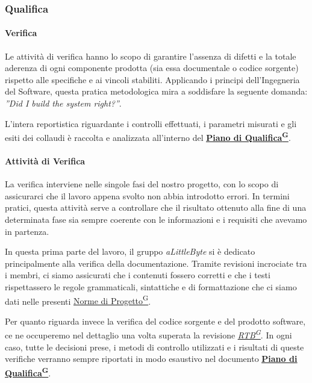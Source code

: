 \documentclass[a4paper,12pt]{article}
\providecommand{\glslink}[2]{\href{https://alittlebyte-19.github.io/Documentazione/glossario.html\#gls-#1}{\underline{#2}\textsuperscript{\scriptsize G}}}
\begin{document}
\subsubsection{Qualifica}

\paragraph{Verifica}

Le attività di verifica hanno lo scopo di garantire l'assenza di difetti e la totale aderenza di ogni componente prodotta (sia essa documentale o codice sorgente) rispetto alle specifiche e ai vincoli stabiliti. Applicando i principi dell'Ingegneria del Software, questa pratica metodologica mira a soddisfare la seguente domanda: \textit{''Did I build the system right?''}.

L'intera reportistica riguardante i controlli effettuati, i parametri misurati e gli esiti dei collaudi è raccolta e analizzata all'interno del \textbf{\glslink{piano-di-qualifica}{Piano di Qualifica}}. 

\paragraph{Attività di Verifica}

La verifica interviene nelle singole fasi del nostro progetto, con lo scopo di assicurarci che il lavoro appena svolto non abbia introdotto errori. In termini pratici, questa attività serve a controllare che il risultato ottenuto alla fine di una determinata fase sia sempre coerente con le informazioni e i requisiti che avevamo in partenza.

In questa prima parte del lavoro, il gruppo \textit{aLittleByte} si è dedicato principalmente alla verifica della documentazione. Tramite revisioni incrociate tra i membri, ci siamo assicurati che i contenuti fossero corretti e che i testi rispettassero le regole grammaticali, sintattiche e di formattazione che ci siamo dati nelle presenti \glslink{norme-di-progetto}{Norme di Progetto}.

Per quanto riguarda invece la verifica del codice sorgente e del prodotto software, ce ne occuperemo nel dettaglio una volta superata la revisione \textit{\glslink{rtb-requirements-and-technology-baseline}{RTB}}. In ogni caso, tutte le decisioni prese, i metodi di controllo utilizzati e i risultati di queste verifiche verranno sempre riportati in modo esaustivo nel documento \textbf{\glslink{piano-di-qualifica}{Piano di Qualifica}}.
\end{document}
